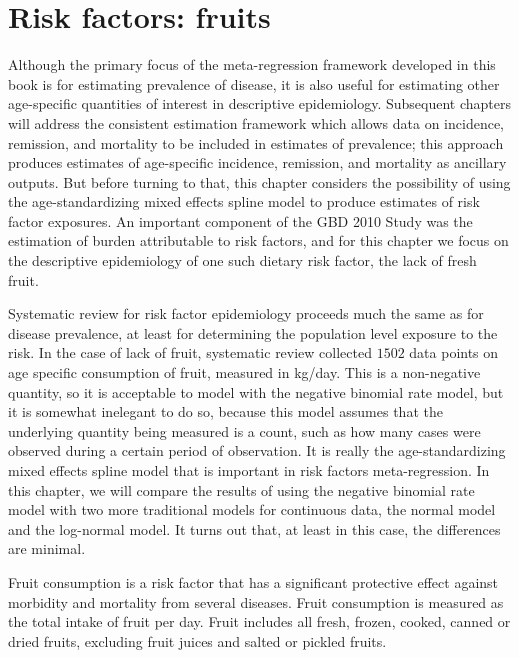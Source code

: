 \chapter{Risk factors: fruits}
\label{applications-log_normal}

Although the primary focus of the meta-regression framework developed
in this book is for estimating prevalence of disease, it is also
useful for estimating other age-specific quantities of interest in
descriptive epidemiology.  Subsequent chapters will address the
consistent estimation framework which allows data on incidence,
remission, and mortality to be included in estimates of prevalence;
this approach produces estimates of age-specific incidence, remission,
and mortality as ancillary outputs.  But before turning to that,
this chapter considers the possibility of using the
age-standardizing mixed effects spline model to produce estimates of
risk factor exposures.  An important component of the GBD 2010 Study
was the estimation of burden attributable to risk factors, and for
this chapter we focus on the descriptive epidemiology of one such
dietary risk factor, the lack of fresh fruit.

Systematic review for
risk factor epidemiology proceeds much the same as for disease
prevalence, at least for determining the population level exposure to
the risk.  In the case of lack of fruit, systematic review collected
$1502$ data points on age specific consumption of fruit, measured in
kg/day.  This is a non-negative quantity, so it is acceptable to model
with the negative binomial rate model, but it is somewhat inelegant to
do so, because this model assumes that the underlying quantity being
measured is a count, such as how many cases were observed during a
certain period of observation.  It is really the age-standardizing
mixed effects spline model that is important in risk factors
meta-regression.  In this chapter, we will compare the results of
using the negative binomial rate model with two more traditional
models for continuous data, the normal model and the log-normal model.
It turns out that, at least in this case, the differences are minimal.

Fruit consumption is a risk factor that has a significant protective
effect against morbidity and mortality from several diseases.  Fruit
consumption is measured as the total intake of fruit per day.  Fruit
includes all fresh, frozen, cooked, canned or dried fruits, excluding
fruit juices and salted or pickled fruits. \cite{he_increased_2007,
  boeing_intake_2006}

